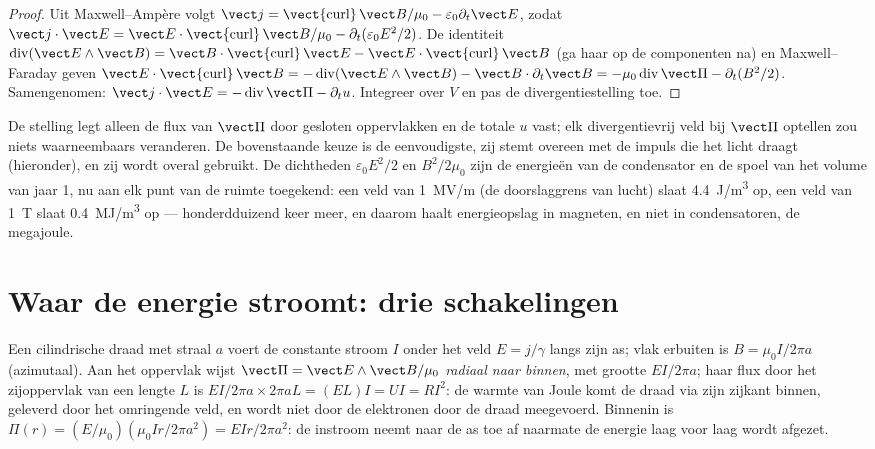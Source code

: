 \begin{proof}
Uit Maxwell--Ampère volgt
$\vect j = \operatorname{\vect{curl}}\vect B/\mu_0 - \varepsilon_0\partial_t
\vect E$,
zodat
$\vect j\cdot\vect E = \vect E\cdot\operatorname{\vect{curl}}\vect B/\mu_0 -
\partial_t(\varepsilon_0E^2/2)$.
De identiteit
$\operatorname{div}(\vect E\wedge\vect B) = \vect B
\cdot\operatorname{\vect{curl}}\vect E - \vect E\cdot\operatorname{\vect{curl}}\vect B$
(ga haar op de componenten na) en Maxwell--Faraday geven
$\vect E\cdot\operatorname{\vect{curl}}
\vect B = -\operatorname{div}(\vect E\wedge\vect B) - \vect B\cdot\partial_t\vect B = -\mu_0
\operatorname{div}\vect\Pi - \partial_t(B^2/2)$.
Samengenomen:
$\vect j\cdot\vect E = -\operatorname{div}
\vect\Pi - \partial_tu$.
Integreer over $V$ en pas de divergentiestelling toe.
\end{proof}

\begin{remark}\label{rem:b2:poynting-vector:interpretation}
De stelling legt alleen de flux van $\vect\Pi$ door gesloten oppervlakken en
de totale $u$ vast; elk divergentievrij veld bij $\vect\Pi$ optellen zou
niets waarneembaars veranderen. De bovenstaande keuze is de eenvoudigste,
zij stemt overeen met de impuls die het licht draagt (hieronder), en zij
wordt overal gebruikt. De dichtheden $\varepsilon_0E^2/2$ en $B^2/2\mu_0$
zijn de energieën van de condensator en de spoel van het volume van jaar 1,
nu aan elk punt van de ruimte toegekend: een veld van \qty{1}{MV/m} (de
doorslaggrens van lucht) slaat \qty{4.4}{J/m^3} op, een veld van \qty{1}{T}
slaat \qty{0.4}{MJ/m^3} op --- honderdduizend keer meer, en daarom haalt
energieopslag in magneten, en niet in condensatoren, de megajoule.
\end{remark}

\section{Waar de energie stroomt: drie schakelingen}

\begin{example}[De weerstandsdraad]\label{ex:b2:poynting-vector:wire}
Een cilindrische draad met straal $a$ voert de constante stroom $I$ onder
het veld $E = j/\gamma$ langs zijn as; vlak erbuiten is $B = \mu_0I/2\pi a$
(azimutaal). Aan het oppervlak wijst $\vect\Pi = \vect E\wedge\vect B/\mu_0$
\emph{radiaal naar binnen}, met grootte $EI/2\pi a$; haar flux door het
zijoppervlak van een lengte $L$ is
$EI/2\pi a\times2\pi aL = (EL)I = UI =
RI^2$: de warmte van Joule komt de
draad via zijn zijkant binnen, geleverd door het omringende veld, en wordt
niet door de elektronen door de draad meegevoerd. Binnenin is
$\Pi(r) = (E/\mu_0)(\mu_0Ir/2\pi a^2) = EIr/2\pi a^2$: de instroom neemt
naar de as toe af naarmate de energie laag voor laag wordt afgezet.
\end{example}

